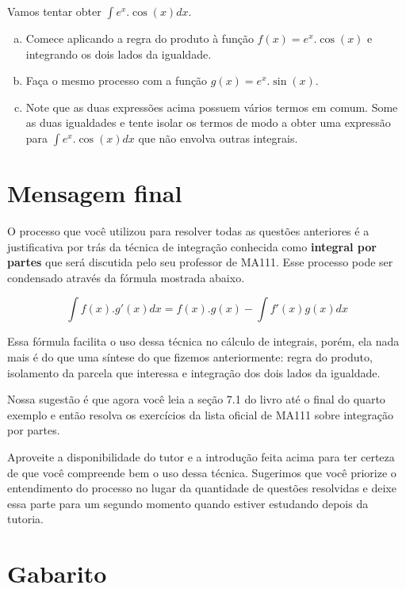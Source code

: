 \documentclass[main_estudante.tex]{subfiles}
\begin{document}
\begin{questao}
Vamos tentar obter $\int e^x.\cos(x) dx$.
\begin{enumerate}[a)]
\item Comece aplicando a regra do produto à função $f(x)=e^x.\cos(x)$ e integrando os dois lados da igualdade.
\item Faça o mesmo processo com a função $g(x)=e^x.\sin(x)$.
\item Note que as duas expressões acima possuem vários termos em comum. Some as duas igualdades e tente isolar os termos de modo a obter uma expressão para $\int e^x.\cos(x) dx$ que não envolva outras integrais.
\end{enumerate}
\end{questao}

\section{Mensagem final}

O processo que você utilizou para resolver todas as questões anteriores é a justificativa por trás da técnica de integração conhecida como \textbf{integral por partes} que será discutida pelo seu professor de MA111. Esse processo pode ser condensado através da fórmula mostrada abaixo.

\begin{shaded*}
$$\int f(x).g'(x)dx = f(x).g(x)-\int f'(x)g(x)dx$$
\end{shaded*}

Essa fórmula facilita o uso dessa técnica no cálculo de integrais, porém, ela nada mais é do que uma síntese do que fizemos anteriormente: regra do produto, isolamento da parcela que interessa e integração dos dois lados da igualdade.

Nossa sugestão é que agora você leia a seção 7.1 do livro  até o final do quarto exemplo e então resolva os exercícios da lista oficial de MA111 sobre integração por partes.

Aproveite a disponibilidade do tutor e a introdução feita acima para ter certeza de que você compreende bem o uso dessa técnica. Sugerimos que você priorize o entendimento do processo no lugar da quantidade de questões resolvidas e deixe essa parte para um segundo momento quando estiver estudando depois da tutoria.

\newpage

\section{Gabarito}
\end{document}
